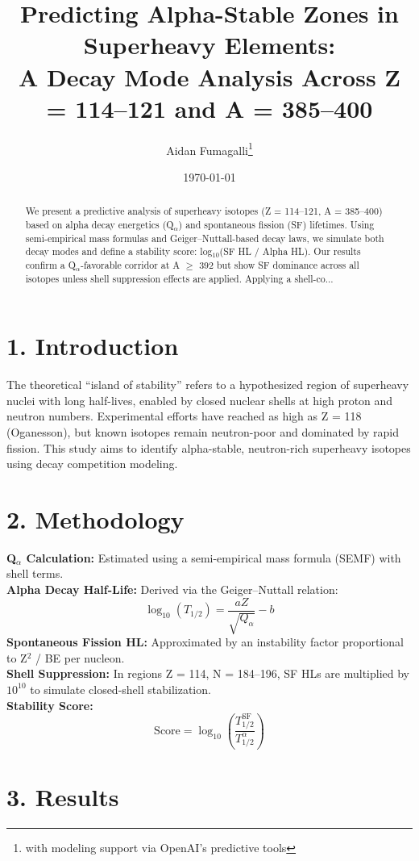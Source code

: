 \documentclass[12pt]{article}
\title{\textbf{Predicting Alpha-Stable Zones in Superheavy Elements:\\ A Decay Mode Analysis Across Z = 114--121 and A = 385--400}}
\author{Aidan Fumagalli\thanks{with modeling support via OpenAI's predictive tools}}
\date{\today}
\begin{document}
\maketitle

\begin{abstract}
We present a predictive analysis of superheavy isotopes (Z = 114--121, A = 385--400) based on alpha decay energetics (Q$_\alpha$) and spontaneous fission (SF) lifetimes. Using semi-empirical mass formulas and Geiger--Nuttall-based decay laws, we simulate both decay modes and define a stability score: log$_{10}$(SF HL / Alpha HL). Our results confirm a Q$_\alpha$-favorable corridor at A $\geq$ 392 but show SF dominance across all isotopes unless shell suppression effects are applied. Applying a shell-co...
\end{abstract}

\section*{1. Introduction}
The theoretical ``island of stability'' refers to a hypothesized region of superheavy nuclei with long half-lives, enabled by closed nuclear shells at high proton and neutron numbers. Experimental efforts have reached as high as Z = 118 (Oganesson), but known isotopes remain neutron-poor and dominated by rapid fission. This study aims to identify alpha-stable, neutron-rich superheavy isotopes using decay competition modeling.

\section*{2. Methodology}

\textbf{Q$_\alpha$ Calculation:} Estimated using a semi-empirical mass formula (SEMF) with shell terms.\\
\textbf{Alpha Decay Half-Life:} Derived via the Geiger--Nuttall relation:
\[
\log_{10}(T_{1/2}) = \frac{aZ}{\sqrt{Q_\alpha}} - b
\]
\textbf{Spontaneous Fission HL:} Approximated by an instability factor proportional to Z$^2$ / BE per nucleon.\\
\textbf{Shell Suppression:} In regions Z = 114, N = 184--196, SF HLs are multiplied by $10^{10}$ to simulate closed-shell stabilization.\\
\textbf{Stability Score:}
\[
\text{Score} = \log_{10} \left( \frac{T_{1/2}^{\text{SF}}}{T_{1/2}^{\alpha}} \right)
\]

\section*{3. Results}
\end{document}
